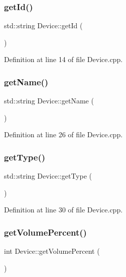 \subsubsection{\texorpdfstring{get\+Id()}{getId()}}
{\footnotesize\ttfamily std\+::string Device\+::get\+Id (\begin{DoxyParamCaption}{ }\end{DoxyParamCaption})}



Definition at line 14 of file Device.\+cpp.

\mbox{\label{class_device_a7e27b36eae579176707a47b682d84a22}} 
\subsubsection{\texorpdfstring{get\+Name()}{getName()}}
{\footnotesize\ttfamily std\+::string Device\+::get\+Name (\begin{DoxyParamCaption}{ }\end{DoxyParamCaption})}



Definition at line 26 of file Device.\+cpp.

\mbox{\label{class_device_afc4d7d248d4ea70e69129c47d4ef1dc6}} 
\subsubsection{\texorpdfstring{get\+Type()}{getType()}}
{\footnotesize\ttfamily std\+::string Device\+::get\+Type (\begin{DoxyParamCaption}{ }\end{DoxyParamCaption})}



Definition at line 30 of file Device.\+cpp.

\mbox{\label{class_device_a13ffb336487ca8f938b1ad0f42259785}} 
\subsubsection{\texorpdfstring{get\+Volume\+Percent()}{getVolumePercent()}}
{\footnotesize\ttfamily int Device\+::get\+Volume\+Percent (\begin{DoxyParamCaption}{ }\end{DoxyParamCaption})}



